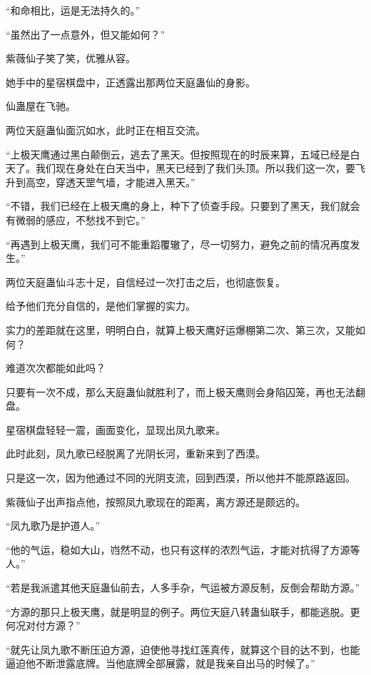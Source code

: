
\begin{this_body}



“和命相比，运是无法持久的。”

“虽然出了一点意外，但又能如何？”

紫薇仙子笑了笑，优雅从容。

她手中的星宿棋盘中，正透露出那两位天庭蛊仙的身影。

仙蛊屋在飞驰。

两位天庭蛊仙面沉如水，此时正在相互交流。

“上极天鹰通过黑白颠倒云，逃去了黑天。但按照现在的时辰来算，五域已经是白天了。我们现在身处在白天当中，黑天已经到了我们头顶。所以我们这一次，要飞升到高空，穿透天罡气墙，才能进入黑天。”

“不错，我们已经在上极天鹰的身上，种下了侦查手段。只要到了黑天，我们就会有微弱的感应，不愁找不到它。”

“再遇到上极天鹰，我们可不能重蹈覆辙了，尽一切努力，避免之前的情况再度发生。”

两位天庭蛊仙斗志十足，自信经过一次打击之后，也彻底恢复。

给予他们充分自信的，是他们掌握的实力。

实力的差距就在这里，明明白白，就算上极天鹰好运爆棚第二次、第三次，又能如何？

难道次次都能如此吗？

只要有一次不成，那么天庭蛊仙就胜利了，而上极天鹰则会身陷囚笼，再也无法翻盘。

星宿棋盘轻轻一震，画面变化，显现出凤九歌来。

此时此刻，凤九歌已经脱离了光阴长河，重新来到了西漠。

只是这一次，因为他通过不同的光阴支流，回到西漠，所以他并不能原路返回。

紫薇仙子出声指点他，按照凤九歌现在的距离，离方源还是颇远的。

“凤九歌乃是护道人。”

“他的气运，稳如大山，岿然不动，也只有这样的浓烈气运，才能对抗得了方源等人。”

“若是我派遣其他天庭蛊仙前去，人多手杂，气运被方源反制，反倒会帮助方源。”

“方源的那只上极天鹰，就是明显的例子。两位天庭八转蛊仙联手，都能逃脱。更何况对付方源？”

“就先让凤九歌不断压迫方源，迫使他寻找红莲真传，就算这个目的达不到，也能逼迫他不断泄露底牌。当他底牌全部展露，就是我亲自出马的时候了。”


\end{this_body}
